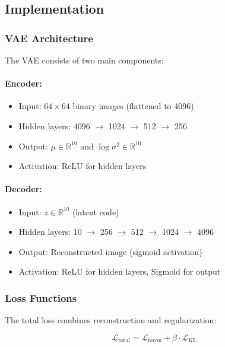 \documentclass[conference]{IEEEtran}
\begin{document}
\subsection{Implementation}

\subsubsection{VAE Architecture}

The VAE consists of two main components:

\paragraph{Encoder:}
\begin{itemize}
    \item Input: $64 \times 64$ binary images (flattened to 4096)
    \item Hidden layers: 4096 $\rightarrow$ 1024 $\rightarrow$ 512 $\rightarrow$ 256
    \item Output: $\mu \in \mathbb{R}^{10}$ and $\log\sigma^2 \in \mathbb{R}^{10}$
    \item Activation: ReLU for hidden layers
\end{itemize}

\paragraph{Decoder:}
\begin{itemize}
    \item Input: $z \in \mathbb{R}^{10}$ (latent code)
    \item Hidden layers: 10 $\rightarrow$ 256 $\rightarrow$ 512 $\rightarrow$ 1024 $\rightarrow$ 4096
    \item Output: Reconstructed image (sigmoid activation)
    \item Activation: ReLU for hidden layers, Sigmoid for output
\end{itemize}

\subsubsection{Loss Functions}

The total loss combines reconstruction and regularization:

\begin{equation}
\mathcal{L}_{\text{total}} = \mathcal{L}_{\text{recon}} + \beta \cdot \mathcal{L}_{\text{KL}}
\end{equation}
\end{document}
